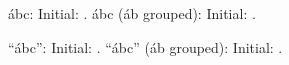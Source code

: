 \documentclass[12pt]{article}
\begin{document}
ábc: 
Initial: \result. {áb}c (áb grouped): 
Initial: \result. 

``ábc'': 
Initial: \result. ``{áb}c'' (áb grouped): 
Initial: \result. 
\end{document}
